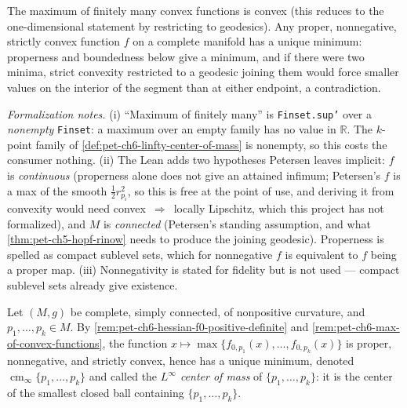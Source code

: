 \begin{remark}
  \label{rem:pet-ch6-max-of-convex-functions}
  \leanok
  The maximum of finitely many convex functions is convex (this reduces to
  the one-dimensional statement by restricting to geodesics). Any proper,
  nonnegative, strictly convex function $f$ on a complete manifold has a
  unique minimum: properness and boundedness below give a minimum, and if
  there were two minima, strict convexity restricted to a geodesic joining
  them would force smaller values on the interior of the segment than at
  either endpoint, a contradiction.

  \emph{Formalization notes.} (i) ``Maximum of finitely many'' is
  \texttt{Finset.sup'} over a \emph{nonempty} \texttt{Finset}: a maximum over
  an empty family has no value in $\mathbb{R}$. The $k$-point family of
  \cref{def:pet-ch6-linfty-center-of-mass} is nonempty, so this costs the
  consumer nothing. (ii) The Lean adds two hypotheses Petersen leaves
  implicit: $f$ is \emph{continuous} (properness alone does not give an
  attained infimum; Petersen's $f$ is a max of the smooth $\tfrac12r_{p_i}^2$,
  so this is free at the point of use, and deriving it from convexity would
  need convex~$\Rightarrow$~locally Lipschitz, which this project has not
  formalized), and $M$ is \emph{connected} (Petersen's standing assumption,
  and what \cref{thm:pet-ch5-hopf-rinow} needs to produce the joining
  geodesic). Properness is spelled as compact sublevel sets, which for
  nonnegative $f$ is equivalent to $f$ being a proper map. (iii)
  Nonnegativity is stated for fidelity but is not used --- compact sublevel
  sets already give existence.
\end{remark}

\begin{definition}
  \label{def:pet-ch6-linfty-center-of-mass}
  Let $(M,g)$ be complete, simply connected, of nonpositive curvature, and
  $p_1,\dots,p_k\in M$. By
  \cref{rem:pet-ch6-hessian-f0-positive-definite} and
  \cref{rem:pet-ch6-max-of-convex-functions}, the function
  $x\mapsto\max\{f_{0,p_1}(x),\dots,f_{0,p_k}(x)\}$ is proper,
  nonnegative, and strictly convex, hence has a unique minimum, denoted
  $\operatorname{cm}_\infty\{p_1,\dots,p_k\}$ and called the \emph{$L^\infty$ center of
  mass} of $\{p_1,\dots,p_k\}$: it is the center of the smallest closed ball
  containing $\{p_1,\dots,p_k\}$.
\end{definition}

